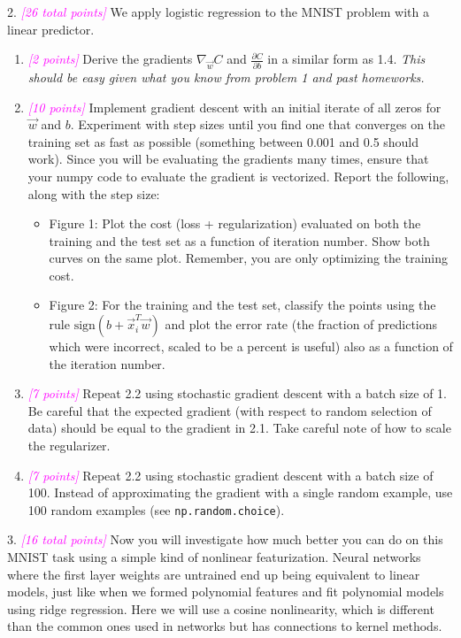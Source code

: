 \documentclass{article}
\newcommand{\points}[1]{\small\textcolor{magenta}{\emph{[#1 points]}} \normalsize}
\begin{document}
2. \points{26 total} We apply logistic regression to the MNIST problem 
with a linear predictor.
\begin{enumerate}
\item \points{2}
  Derive the gradients $\nabla_{\vec w} C$ and $\frac{\partial C}{\partial b}$
  in a similar form as 1.4.
  {\em This should be easy given what you know from problem 1 and past homeworks.}
\item \points{10} Implement gradient descent with an initial iterate
of all zeros for $\vec w$ and $b$.
Experiment with step sizes until you find one that converges on the training set
as fast as possible (something between 0.001 and 0.5 should work).
Since you will be evaluating the gradients many times, 
ensure that your numpy code to evaluate the gradient is vectorized.
Report the following, along with the step size:
\begin{itemize}
\item Figure 1: Plot the cost (loss + regularization) evaluated on both the training and 
  the test set as a function of iteration number.
  Show both curves on the same plot. 
  Remember, you are only optimizing the training cost.
\item Figure 2: For the training and the test set,
  classify the points using the rule $\mathrm{sign}(b + \vec x_i^T \vec w)$
  and plot the error rate 
  (the fraction of predictions which were incorrect, scaled to be a percent is useful)
  also as a function of the iteration number.
\end{itemize}
\item \points{7} Repeat 2.2 using stochastic gradient descent with a 
  batch size of 1.
  Be careful that the expected gradient (with respect to random selection of data)
  should be equal to the gradient in 2.1.
  Take careful note of how to scale the regularizer.
\item \points{7} Repeat 2.2 using stochastic gradient descent with a 
  batch size of 100.
  Instead of approximating the gradient with a single random example,
  use 100 random examples (see {\tt np.random.choice}).
\end{enumerate}

3. \points{16 total} 
Now you will investigate how much better you can do on this MNIST task
using a simple kind of nonlinear featurization.
Neural networks where the first layer weights are untrained end up 
being equivalent to linear models, just like when we formed 
polynomial features and fit polynomial models using ridge regression.
Here we will use a cosine nonlinearity, which is different
than the common ones used in networks but has connections to kernel methods.
\end{document}
